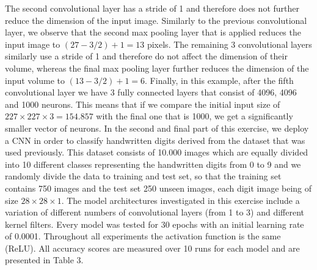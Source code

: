 \documentclass[11pt,conference,compsoc]{IEEEtran}
\begin{document}
The second convolutional layer has a stride of 1 and therefore does not further reduce the dimension of the input image. Similarly to the previous convolutional layer, we observe that the second max pooling layer that is applied reduces the input image to $(27 - 3 /2) + 1 = 13$ pixels. The remaining 3 convolutional layers similarly use a stride of 1 and therefore do not affect the dimension of their volume, whereas the final max pooling layer further reduces the dimension of the input volume to $(13 - 3 /2) + 1 = 6$. Finally, in this example, after the fifth convolutional layer we have 3 fully connected layers that consist of 4096, 4096 and 1000 neurons. This means that if we compare the initial input size of $227 \times 227 \times 3 = 154.857$ with the final one that is 1000, we get a significantly smaller vector of neurons.
In the second and final part of this exercise, we deploy a CNN in order to classify handwritten digits derived from the dataset that was used previously. This dataset consists of 10.000 images which are equally divided into 10 different classes representing the handwritten digits from 0 to 9 and we randomly divide the data to training and test set, so that the training set contains 750 images and the test set 250 unseen images, each digit image being of size $28 \times 28 \times 1$. The model architectures investigated in this exercise include a variation of different numbers of convolutional layers (from 1 to 3) and different kernel filters. Every model was tested for 30 epochs with an initial learning rate of 0.0001. Throughout all experiments the activation function is the same (ReLU). All accuracy scores are measured over 10 runs for each model and are presented in Table 3. 
\end{document}
